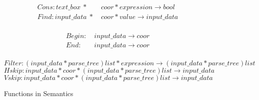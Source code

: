 \begin{figure*}[ht!]
\centering
\begin{minipage}{0.4\columnwidth}
\begin{align*}
  Cons:text\_box~*&~coor*expression \rightarrow bool \\
  Find:input\_data~*&~coor*value \rightarrow input\_data \\
\end{align*}
\end{minipage}
\hspace{10 mm}
\begin{minipage}{0.4\columnwidth}
\begin{align*}
  Begin:&~input\_data \rightarrow coor \\
  End:&~input\_data \rightarrow coor \\
\end{align*}
\end{minipage}
\vspace{-6 mm}
\[
  Filter:(input\_data*parse\_tree)list*expression \rightarrow (input\_data*parse\_tree)list
\]
\[
  Hskip:input\_data*coor*(input\_data*parse\_tree)list \rightarrow input\_data
\]
\[
  Vskip:input\_data*coor*(input\_data*parse\_tree)list \rightarrow input\_data
\]
\caption{Functions in Semantics}\label{fig:funseman}
\end{figure*}

